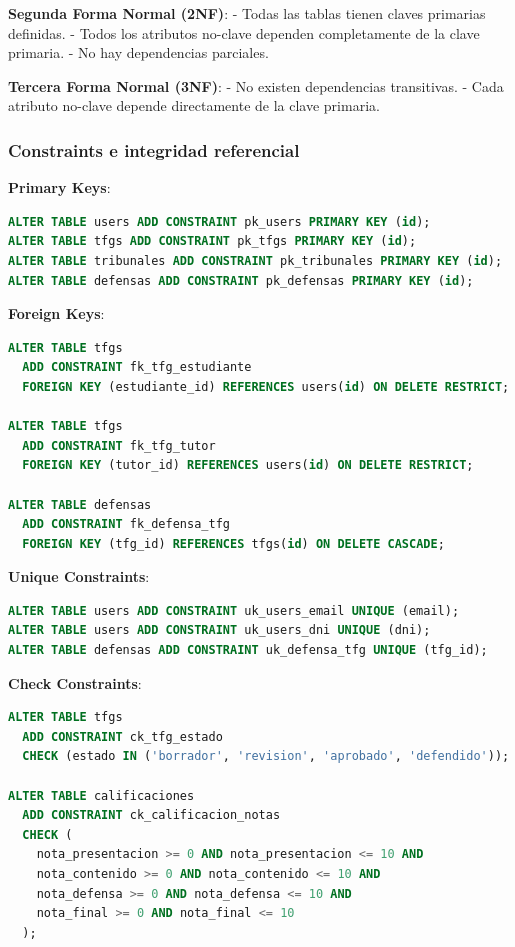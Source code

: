 \documentclass[12pt,a4paper,oneside]{report}
\begin{document}
\textbf{Segunda Forma Normal (2NF)}: - Todas las tablas tienen claves
primarias definidas. - Todos los atributos no-clave dependen
completamente de la clave primaria. - No hay dependencias parciales.

\textbf{Tercera Forma Normal (3NF)}: - No existen dependencias
transitivas. - Cada atributo no-clave depende directamente de la clave
primaria.

\subsubsection{Constraints e integridad
referencial}\label{constraints-e-integridad-referencial}

\textbf{Primary Keys}:

\begin{lstlisting}[language=SQL]
ALTER TABLE users ADD CONSTRAINT pk_users PRIMARY KEY (id);
ALTER TABLE tfgs ADD CONSTRAINT pk_tfgs PRIMARY KEY (id);
ALTER TABLE tribunales ADD CONSTRAINT pk_tribunales PRIMARY KEY (id);
ALTER TABLE defensas ADD CONSTRAINT pk_defensas PRIMARY KEY (id);
\end{lstlisting}

\textbf{Foreign Keys}:

\begin{lstlisting}[language=SQL]
ALTER TABLE tfgs 
  ADD CONSTRAINT fk_tfg_estudiante 
  FOREIGN KEY (estudiante_id) REFERENCES users(id) ON DELETE RESTRICT;

ALTER TABLE tfgs 
  ADD CONSTRAINT fk_tfg_tutor 
  FOREIGN KEY (tutor_id) REFERENCES users(id) ON DELETE RESTRICT;

ALTER TABLE defensas 
  ADD CONSTRAINT fk_defensa_tfg 
  FOREIGN KEY (tfg_id) REFERENCES tfgs(id) ON DELETE CASCADE;
\end{lstlisting}

\textbf{Unique Constraints}:

\begin{lstlisting}[language=SQL]
ALTER TABLE users ADD CONSTRAINT uk_users_email UNIQUE (email);
ALTER TABLE users ADD CONSTRAINT uk_users_dni UNIQUE (dni);
ALTER TABLE defensas ADD CONSTRAINT uk_defensa_tfg UNIQUE (tfg_id);
\end{lstlisting}

\textbf{Check Constraints}:

\begin{lstlisting}[language=SQL]
ALTER TABLE tfgs 
  ADD CONSTRAINT ck_tfg_estado 
  CHECK (estado IN ('borrador', 'revision', 'aprobado', 'defendido'));

ALTER TABLE calificaciones 
  ADD CONSTRAINT ck_calificacion_notas 
  CHECK (
    nota_presentacion >= 0 AND nota_presentacion <= 10 AND
    nota_contenido >= 0 AND nota_contenido <= 10 AND
    nota_defensa >= 0 AND nota_defensa <= 10 AND
    nota_final >= 0 AND nota_final <= 10
  );
\end{lstlisting}
\end{document}
